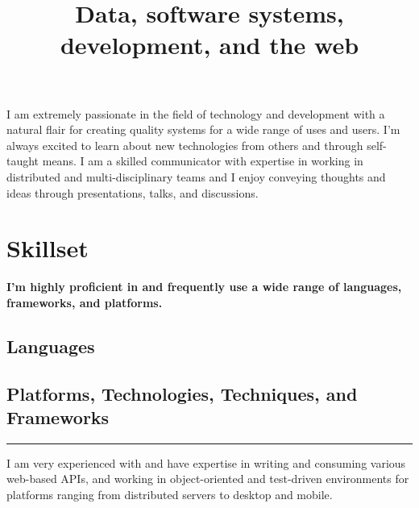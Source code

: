 \documentclass[11pt,a4paper,sans]{moderncv} %
\title{\small{Data, software systems, development, and the web}}
\begin{document}
\makecvtitle

\vspace{-1cm}

\parbox[b][5em][t]{1.0\textwidth}{I am extremely passionate in the field of technology and development with a natural flair for creating quality systems for a wide range of uses and users. I'm always excited to learn about new technologies from others and through self-taught means. I am a skilled communicator with expertise in working in distributed and multi-disciplinary teams and I enjoy conveying thoughts and ideas through presentations, talks, and discussions.}

\section{Skillset}
\textbf{I'm highly proficient in and frequently use a wide range of languages, frameworks, and platforms.}
	\subsection{Languages}

	\subsection{Platforms, Technologies, Techniques, and Frameworks}
        {\color{gray} \rule{\linewidth}{0.1mm} }
        
        \parbox[b][2em][t]{\textwidth}{I am very experienced with and have expertise in writing and consuming various web-based APIs, and working in object-oriented and test-driven environments for platforms ranging from distributed servers to desktop and mobile.}

	
\end{document}
